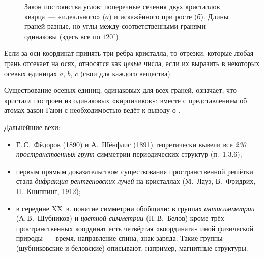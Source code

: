 \begin{figure}[ht]
\centering
{}
\caption{Закон постоянства углов: поперечные сечения двух кристаллов
кварца~— «идеального» (\textit{а}) и искажённого при росте (\textit{б}).
Длины граней разные, но углы между соответственными гранями одинаковы
(здесь все по $120^\circ$)}
\label{fig:steno}
\end{figure}

\begin{glavnoe}
Если за оси координат принять три ребра кристалла, то отрезки, которые
любая грань отсекает на осях, относятся как \emph{целые} числа, если их
выразить в некоторых осевых единицах $a$, $b$, $c$ (свои для каждого
вещества).
\end{glavnoe}

Существование осевых единиц, одинаковых для всех граней, означает, что
кристалл построен из одинаковых «кирпичиков»: вместе с представлением об
атомах закон Гаюи с необходимостью ведёт к выводу о .

Дальнейшие вехи:
\begin{itemize}
\item Е.\,С.~Фёдоров (1890) и А.~Шёнфлис (1891) теоретически вывели все
\emph{230 пространственных групп} симметрии периодических структур
(п.~1.3.6);
\item первым прямым доказательством существования пространственной
решётки стала \emph{дифракция рентгеновских лучей} на кристаллах
(М.~Лауэ, В.~Фридрих, П.~Книппинг, 1912);
\item в середине XX~в. понятие симметрии обобщили: в группах
\emph{антисимметрии} (А.\,В.~Шубников) и \emph{цветной симметрии}
(Н.\,В.~Белов) кроме трёх пространственных координат есть четвёртая
«координата» иной физической природы~— время, направление спина, знак
заряда. Такие группы (шубниковские и беловские) описывают, например,
магнитные структуры.
\end{itemize}

